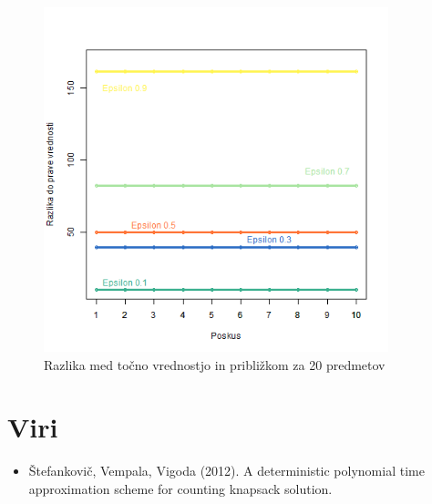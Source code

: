 \documentclass[a4paper,12pt]{article}
\begin{document}
\begin{figure}[H]
\centering
\caption{Razlika med točno vrednostjo in približkom za 20 predmetov}
\includegraphics[width=10 cm, height = 10cm]{Odstopanje20}
\end{figure}


\newpage

\section{Viri}

\begin{itemize}
\item Štefankovič, Vempala, Vigoda (2012). A deterministic polynomial time approximation scheme for counting knapsack solution.
\end{itemize}
\end{document}
